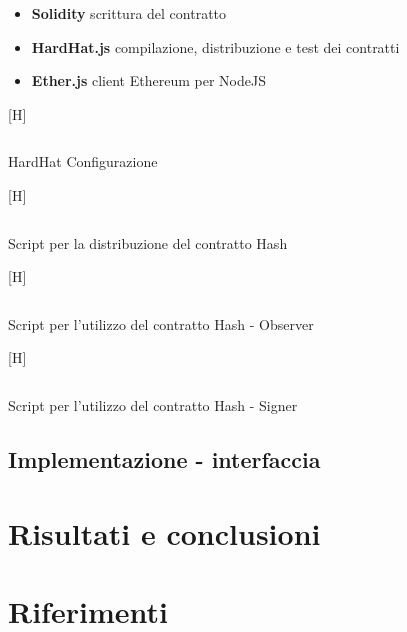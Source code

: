 \documentclass[a4paper,11pt]{article}
\newenvironment{longlisting}{\captionsetup{type=figure}}{}
\begin{document}
\begin{itemize}
  \item \textbf{Solidity} scrittura del contratto
  \item \textbf{HardHat.js} compilazione, distribuzione e test dei contratti
  \item \textbf{Ether.js} client Ethereum per NodeJS
\end{itemize}



\begin{longlisting}[H]
  \inputminted{typescript}{./code/hardhat.config.ts}
  \caption{HardHat Configurazione}
  \label{listing:hardhatconf}
\end{longlisting}

\begin{longlisting}[H]
  \inputminted{typescript}{./code/hash.deploy.ts}
  \caption{Script per la distribuzione del contratto Hash}
  \label{listing:hash4}
\end{longlisting}

\begin{longlisting}[H]
  \inputminted{typescript}{./code/hash.listener.ts}
  \caption{Script per l'utilizzo del contratto Hash - Observer}
  \label{listing:hash5}
\end{longlisting}

\begin{longlisting}[H]
  \inputminted{typescript}{./code/hash.sign.ts}
  \caption{Script per l'utilizzo del contratto Hash - Signer}
  \label{listing:hash6}
\end{longlisting}


\subsection{Implementazione - interfaccia}


\section{Risultati e conclusioni}

\clearpage
\section{Riferimenti}
\listoffigures
\clearpage
\listoftables
\clearpage
\renewcommand\listoflistingscaption{Elenco del codice sorgente}
\listoflistings %
\clearpage
\printbibliography
\end{document}
